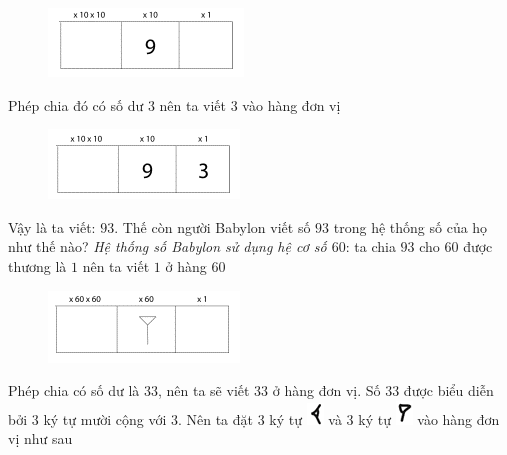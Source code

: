 \begin{multicols}{2}
	\begin{figure}[H]
		\centering
		\vspace*{-5pt}
		\captionsetup{labelformat= empty, justification=centering}
		\includegraphics[width=0.65\linewidth]{19}
		\vspace*{-10pt}
	\end{figure}
	Phép chia đó có số dư $3$ nên ta viết $3$ vào hàng đơn vị
	\begin{figure}[H]
		\centering
		\vspace*{-5pt}
		\captionsetup{labelformat= empty, justification=centering}
		\includegraphics[width=0.65\linewidth]{20}
		\vspace*{-10pt}
	\end{figure}
	Vậy là ta viết: $93$.
	\vskip 0.1cm
	Thế còn người Babylon viết số $93$ trong hệ thống số của họ như thế nào?
	\vskip 0.1cm
	\textit{Hệ thống số Babylon sử dụng hệ cơ số $60$}: ta chia $93$ cho $60$ được thương là $1$ nên ta viết $1$ ở hàng $60$
	\begin{figure}[H]
		\centering
		\vspace*{-5pt}
		\captionsetup{labelformat= empty, justification=centering}
		\includegraphics[width=0.65\linewidth]{21}
		\vspace*{-10pt}
	\end{figure}
	Phép chia có số dư là $33$, nên ta sẽ viết $33$ ở hàng đơn vị. Số $33$ được biểu diễn bởi $3$ ký tự mười cộng với $3$. Nên ta đặt $3$ ký tự \includegraphics[scale=0.65]{16} và $3$ ký tự \includegraphics[scale=0.65]{15} vào hàng đơn vị như sau

\end{multicols}
